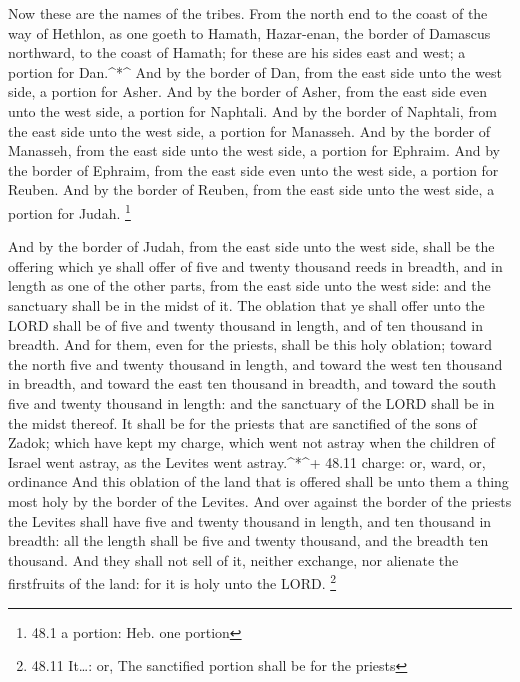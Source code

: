  Now these are the names of the tribes. From the north end
to the coast of the way of Hethlon, as one goeth to Hamath, Hazar-enan,
the border of Damascus northward, to the coast of Hamath; for these are
his sides east and west; a portion for Dan.\^{}*\^{}  And by
the border of Dan, from the east side unto the west side, a portion for
Asher.  And by the border of Asher, from the east side even
unto the west side, a portion for Naphtali.  And by the
border of Naphtali, from the east side unto the west side, a portion for
Manasseh.  And by the border of Manasseh, from the east side
unto the west side, a portion for Ephraim.  And by the
border of Ephraim, from the east side even unto the west side, a portion
for Reuben.  And by the border of Reuben, from the east side
unto the west side, a portion for Judah. \footnote{48.1 a portion: Heb.
  one portion}

 And by the border of Judah, from the east side unto the
west side, shall be the offering which ye shall offer of five and twenty
thousand reeds in breadth, and in length as one of the other parts, from
the east side unto the west side: and the sanctuary shall be in the
midst of it.  The oblation that ye shall offer unto the LORD
shall be of five and twenty thousand in length, and of ten thousand in
breadth.  And for them, even for the priests, shall be this
holy oblation; toward the north five and twenty thousand in length, and
toward the west ten thousand in breadth, and toward the east ten
thousand in breadth, and toward the south five and twenty thousand in
length: and the sanctuary of the LORD shall be in the midst thereof.
 It shall be for the priests that are sanctified of the
sons of Zadok; which have kept my charge, which went not astray when the
children of Israel went astray, as the Levites went astray.\^{}*\^{}+
48.11 charge: or, ward, or, ordinance  And this oblation of
the land that is offered shall be unto them a thing most holy by the
border of the Levites.  And over against the border of the
priests the Levites shall have five and twenty thousand in length, and
ten thousand in breadth: all the length shall be five and twenty
thousand, and the breadth ten thousand.  And they shall not
sell of it, neither exchange, nor alienate the firstfruits of the land:
for it is holy unto the LORD. \footnote{48.11 It\ldots: or, The
  sanctified portion shall be for the priests}

